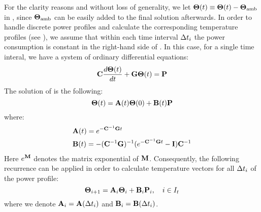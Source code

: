 For the clarity reasons and without loss of generality, we let $\mathbf{\Theta}(t) \equiv \mathbf{\Theta}(t) - \mathbf{\Theta}_{\text{amb}}$ in , since $\mathbf{\Theta}_{\text{amb}}$ can be easily added to the final solution afterwards. In order to handle discrete power profiles and calculate the corresponding temperature profiles (see ), we assume that within each time interval $\Delta t_i$ the power consumption is constant in the right-hand side of . In this case, for a single time interal, we have a system of ordinary differential equations:
\begin{equation} \equlabel{fourier-constant-power}
  \mcapacitance \frac{d\vtemp(\time)}{d\time} + \mconductance \vtemp(\time) = \vpower
\end{equation}
The solution of  is the following:
\[
  \mathbf{\Theta}(t) = \mathbf{A}(t) \mathbf{\Theta}(0) + \mathbf{B}(t) \mathbf{P}
\]
where:
\begin{align}
  & \m{A}(\time) = \emcg{\time} \equlabel{a} \\
  & \m{B}(\time) = -(\cg)^{-1}(\emcg{\time} - \mone) \mcapacitance^{-1} \equlabel{b}
\end{align}
Here $e^{\mathbf{M}}$ denotes the matrix exponential of $\mathbf{M}$. Consequently, the following recurrence can be applied in order to calculate temperature vectors for all $\Delta t_i$ of the power profile:
\begin{equation} \equlabel{fourier-recurrence}
  \vtemp_{i + 1} = \m{A}_i \vtemp_i + \m{B}_i \vpower_i, \sep i \in \timeindex
\end{equation}
where we denote $\mathbf{A}_i = \mathbf{A}(\Delta t_i)$ and $\mathbf{B}_i = \mathbf{B}(\Delta t_i)$.
